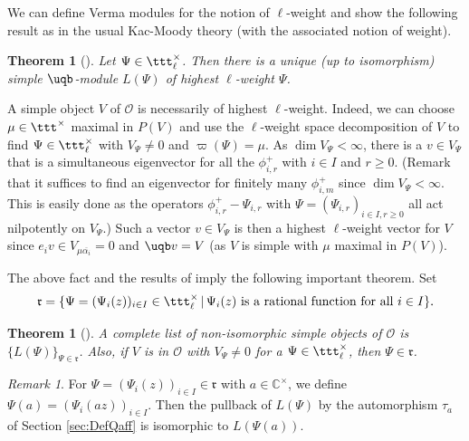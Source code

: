 \documentclass[11pt]{amsart}
\newtheorem{thm}[theorem]{Theorem}
\theoremstyle{definition}
\theoremstyle{remark}
\newtheorem{rem}[theorem]{Remark}
\numberwithin{equation}{section}
\begin{document}
 We can define Verma modules for the notion of $\ell$-weight and show the following result as in the usual Kac-Moody theory (with the associated notion of weight).
\begin{thm}[{\cite[Proposition 3.4]{hj}}]\label{thm:PropSimpleOEx} Let $\Psi \in \ttt^{\times}_{\ell}$. Then there is a unique (up to isomorphism) simple $\uqb$-module $L(\Psi)$ of highest $\ell$-weight $\Psi$.
\end{thm}
A simple object $V$ of $\mathcal{O}$ is necessarily of highest $\ell$-weight. Indeed, we can choose $\mu \in \ttt^{\times}$ maximal in $P(V)$ and use the $\ell$-weight space decomposition of $V$ to find $\Psi \in \ttt^{\times}_{\ell}$ with $V_{\Psi}\neq 0$ and $\varpi(\Psi) = \mu$. As $\dim V_{\Psi} < \infty$, there is a $v \in V_{\Psi}$ that is a simultaneous eigenvector for all the $\phi_{i,r}^+$ with $i\in I$ and $r\geq 0$. (Remark that it suffices to find an eigenvector for finitely many $\phi_{i,m}^{+}$ since $\dim V_{\Psi} < \infty$. This is easily done as the operators $\phi_{i,r}^+-\Psi_{i,r}$ with $\Psi = (\Psi_{i,r})_{i\in I,r\geq 0}$ all act nilpotently on $V_{\Psi}$.) Such a vector $v\in V_{\Psi}$ is then a highest $\ell$-weight vector for $V$ since $e_iv \in V_{\mu \overline{\alpha_i}}= 0$ and $\uqb v = V$ (as $V$ is simple with $\mu$ maximal in $P(V)$). \par The above fact and the results of \cite{hj} imply the following important theorem. Set 
$$\mathfrak{r} = \{\Psi=(\Psi_i(z))_{i\in I}\in \ttt^{\times}_{\ell}\,|\, \Psi_i(z) \text{ is a rational function for all } i\in I\}.$$
\begin{thm}[{\cite[Proposition 3.10 and Theorem 3.11]{hj}}]\label{thm:SimplesO} A complete list of non-isomorphic simple objects of $\mathcal{O}$ is $\{L(\Psi)\}_{\Psi\in\mathfrak{r}}$. Also, if $V$ is in $\mathcal{O}$ with $V_{\Psi}\neq 0$ for a $\Psi\in \ttt^{\times}_{\ell}$, then $\Psi\in \mathfrak{r}$.
\end{thm}
\begin{rem}\label{rem:Psishift} For $\Psi = (\Psi_i(z))_{i\in I} \in \mathfrak{r}$ with $a \in \mathbb{C}^{\times}$, we define $\Psi(a)=(\Psi_i(az))_{i\in I}$. Then the pullback of $L(\Psi)$ by the automorphism $\tau_{a}$ of Section \ref{sec:DefQaff} is isomorphic to $L(\Psi(a))$.
\end{rem}
\end{document}
